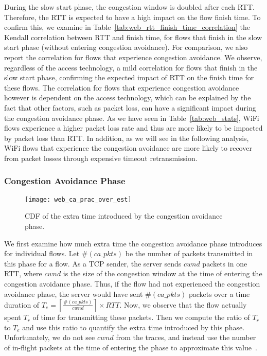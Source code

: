 During the slow start phase, the congestion window is doubled after each RTT. Therefore, the RTT is expected to have a high impact on the flow finish time. To confirm this, we examine in Table~\ref{tab:web_rtt_finish_time_correlation} the Kendall correlation between RTT and finish time, for flows that finish in the slow start phase (\ie without entering congestion avoidance). For comparison, we also report the correlation for flows that experience congestion avoidance. We observe, regardless of the access technology, a mild correlation for flows that finish in the slow start phase, confirming the expected impact of RTT on the finish time for these flows. The correlation for flows that experience congestion avoidance however is dependent on the access technology, which can be explained by the fact that other factors, such as packet loss, can have a significant impact during the congestion avoidance phase. As we have seen in Table~\ref{tab:web_stats}, WiFi flows experience a higher packet loss rate and thus are more likely to be impacted by packet loss than RTT. In addition, as we will see in the following analysis, WiFi flows that experience the congestion avoidance are more likely to recover from packet losses through expensive timeout retransmission.


\subsubsection{Congestion Avoidance Phase}

\begin{figure}[th]
\centering
\texttt{[image: web\_ca\_prac\_over\_est]}
\caption{CDF of the extra time introduced by the congestion avoidance phase.}
\label{fig:web_ca_round}
\end{figure}

We first examine how much extra time the congestion avoidance phase introduces for individual flows. Let $\#(ca\_pkts)$ be the number of packets transmitted in this phase for a flow. As a TCP sender, the server sends $cwnd$ packets in one RTT, where $cwnd$ is the size of the congestion window at the time of entering the congestion avoidance phase. Thus, if the flow had not experienced the congestion avoidance phase, the server would have sent $\#(ca\_pkts)$ packets over a time duration of $T_e =  \left \lceil{\frac{\#(ca\_pkts)}{cwnd}} \right \rceil  \times RTT$. Now, we observe that the flow actually spent $T_r$ of time for transmitting these packets. Then we compute the ratio of  $T_r$ to $T_e$ and use this ratio to quantify the extra time introduced by this phase. Unfortunately, we do not see $cwnd$ from the traces, and instead use the number of in-flight packets at the time of entering the phase to approximate this value~\cite{rfc56812009tcp}. 
 
